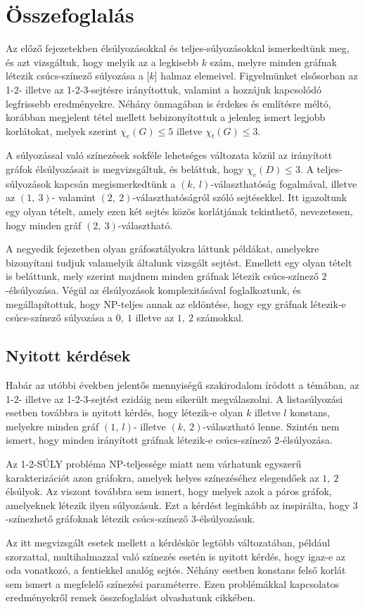 \documentclass[12pt, a4paper]{report}
\theoremstyle{remark}
\theoremstyle{definition}
\begin{document}
\chapter{Összefoglalás}
Az előző fejezetekben élsúlyozásokkal és teljes-súlyozásokkal ismerkedtünk meg, és azt vizsgáltuk, hogy melyik az a legkisebb $k$ szám, melyre minden gráfnak létezik csúcs-színező súlyozása a $\lbrack k \rbrack$ halmaz elemeivel. Figyelmünket elsősorban az 1-2- illetve az 1-2-3-sejtésre irányítottuk, valamint a hozzájuk kapcsolódó legfrissebb eredményekre. Néhány önmagában is érdekes és említésre méltó, korábban megjelent tétel mellett bebizonyítottuk a jelenleg ismert legjobb korlátokat, melyek szerint $\chi_e(G) \leq 5$ illetve $\chi_t(G) \leq 3$.

A súlyozással való színezések sokféle lehetséges változata közül az irányított gráfok élsúlyozásait is megvizsgáltuk, és beláttuk, hogy $\chi_e(D) \leq 3$. A teljes-súlyozások kapcsán megismerkedtünk a $(k,\ l)$-választhatóság fogalmával, illetve az $(1,\ 3)$- valamint $(2,\ 2)$-választhatóságról szóló sejtésekkel. Itt igazoltunk egy olyan tételt, amely ezen két sejtés közös korlátjának tekinthető, nevezetesen, hogy minden gráf $(2,\ 3)$-választható. 

A negyedik fejezetben olyan gráfosztályokra láttunk példákat, amelyekre bizonyítani tudjuk valamelyik általunk vizsgált sejtést. Emellett egy olyan tételt is beláttunk, mely szerint majdnem minden gráfnak létezik csúcs-színező $2$-élsúlyozása. Végül az élsúlyozások komplexitásával foglalkoztunk, és megállapítottuk, hogy NP-teljes annak az eldöntése, hogy egy gráfnak létezik-e csúcs-színező súlyozása a $0,\ 1$ illetve az $1,\ 2$ számokkal.

\section{Nyitott kérdések}
Habár az utóbbi években jelentős mennyiségű szakirodalom íródott a témában, az 1-2- illetve az 1-2-3-sejtést ezidáig nem sikerült megválaszolni. A listasúlyozási esetben továbbra is nyitott kérdés, hogy létezik-e olyan $k$ illetve $l$ konstans, melyekre minden gráf $(1,\ l)$- illetve $(k,\ 2)$-választható lenne. Szintén nem ismert, hogy minden irányított gráfnak létezik-e csúcs-színező $2$-élsúlyozása.

Az 1-2-SÚLY probléma NP-teljessége miatt nem várhatunk egyszerű karakterizációt azon gráfokra, amelyek helyes színezéséhez elegendőek az $1,\ 2$ élsúlyok. Az viszont továbbra sem ismert, hogy melyek azok a páros gráfok, amelyeknek létezik ilyen súlyozásuk. Ezt a kérdést leginkább az inspirálta, hogy $3$-színezhető gráfoknak létezik csúcs-színező $3$-élsúlyozásuk.

Az itt megvizsgált esetek mellett a kérdéskör legtöbb változatában, például szorzattal, multihalmazzal való színezés esetén is nyitott kérdés, hogy igaz-e az oda vonatkozó, a fentiekkel analóg sejtés. Néhány esetben konstans felső korlát sem ismert a megfelelő színezési paraméterre. Ezen problémákkal kapcsolatos eredményekről remek összefoglalást olvashatunk \citeauthor{Seamone2012} \cite{Seamone2012} cikkében.

\printbibliography
\end{document}
